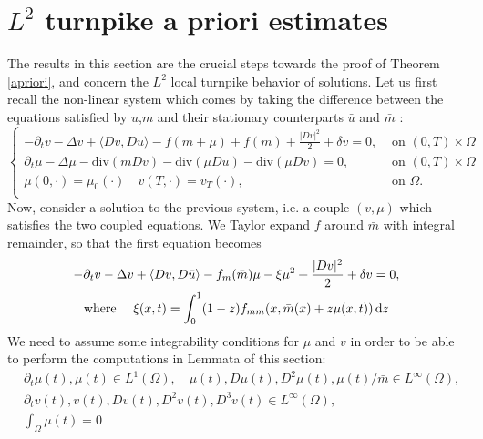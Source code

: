 \documentclass[10pt,a4paper,nouppercase,nowrite]{article}
\numberwithin{equation}{section}
\newcommand{\di}{{\rm d}}
\theoremstyle{definition}
\begin{document}
\section{$L^2$ turnpike a priori estimates} \label{nlturnl2}
	The results in this section are the crucial steps towards the proof of Theorem \ref{apriori}, and concern the $L^2$ local turnpike behavior of solutions. Let us first recall the non-linear system which comes by taking the difference between the equations satisfied by $u$,$m$ and their stationary counterparts $\bar{u}$ and $\bar{m}$ :
	\begin{equation}
		\begin{cases}
			-\partial_t v - \Delta v + \langle Dv,D\bar{u} \rangle - f(\bar{m}+\mu) + f(\bar{m}) + \frac{|Dv|^2}{2} + \delta v=0,&  \text{ on } (0,T) \times \Omega \\
			\partial_t \mu - \Delta \mu - \text{div}(\bar{m}Dv) - \text{div}(\mu D\bar{u}) - \text{div}(\mu Dv)= 0,&  \text{ on } (0,T) \times \Omega  \\
			\mu(0,\cdot)=\mu_0(\cdot) \quad v(T,\cdot)=v_T(\cdot),& \text{ on }  \Omega. \\
		\end{cases}
		\tag{NL}
		\label{nlsys}
	\end{equation}
	Now, consider a solution to the previous system, i.e. a couple $(v,\mu)$ which satisfies the two coupled equations. We Taylor expand $f$ around $\bar{m}$ with integral remainder, so that the first equation becomes
	\begin{multline*}
	-\partial_t v - \Delta v + \langle Dv,D\bar{u} \rangle - f_m(\bar{m})\mu - \xi \mu^2 + \frac{|Dv|^2}{2} + \delta v= 0, \\
	 \text{where \quad $\xi(x,t)=\int_0^1(1-z)f_{mm}(x, \bar m(x) + z \mu(x,t)) \, \di z$}
	 \end{multline*}
	We need to assume some integrability conditions for $\mu$ and $v$ in order to be able to perform the computations in Lemmata of this section:
	\begin{equation}\label{integrab}
	\begin{aligned}
	& \partial_t \mu(t), \mu(t) \in L^1(\Omega), \quad  \mu(t), D \mu(t), D^2 \mu(t), \mu(t) / \bar m \in L^\infty(\Omega), \\
	& \partial_t v(t), v(t), Dv(t), D^2 v(t), D^3 v(t) \in L^\infty(\Omega), \\
	& \int_\Omega \mu(t) = 0
	\end{aligned}
	\end{equation}
\end{document}
